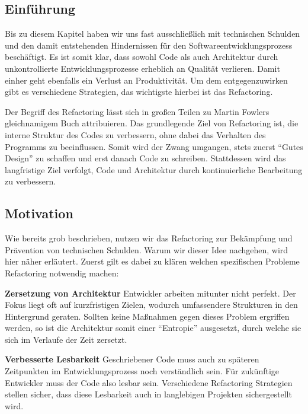 \documentclass[acmtog]{acmart}
\begin{document}
\subsection{Einführung}\label{sec:Refactoring_Einführung}

Bis zu diesem Kapitel haben wir uns fast ausschließlich mit technischen Schulden und den damit entstehenden Hindernissen für den Softwareentwicklungsprozess beschäftigt.
Es ist somit klar, dass sowohl Code als auch Architektur durch unkontrollierte Entwicklungsprozesse erheblich an Qualität verlieren.
Damit einher geht ebenfalls ein Verlust an Produktivität.
Um dem entgegenzuwirken gibt es verschiedene Strategien, das wichtigste hierbei ist das Refactoring.

Der Begriff des Refactoring lässt sich in großen Teilen zu Martin Fowlers gleichnamigem Buch attribuieren.
Das grundlegende Ziel von Refactoring ist, die interne Struktur des Codes zu verbessern, ohne dabei das Verhalten des Programms zu beeinflussen.
Somit wird der Zwang umgangen, stets zuerst “Gutes Design” zu schaffen und erst danach Code zu schreiben.
Stattdessen wird das langfristige Ziel verfolgt, Code und Architektur durch kontinuierliche Bearbeitung zu verbessern. \cite{fowler2019refactoring}

\subsection{Motivation}\label{sec:Motivation}

Wie bereits grob beschrieben, nutzen wir das Refactoring zur Bekämpfung und Prävention von technischen Schulden. Warum wir dieser Idee nachgehen, wird hier näher erläutert. Zuerst gilt es dabei zu klären welchen spezifischen Probleme Refactoring notwendig machen:

\textbf{Zersetzung von Architektur}
Entwickler arbeiten mitunter nicht perfekt. Der Fokus liegt oft auf kurzfristigen Zielen, wodurch umfassendere Strukturen in den Hintergrund geraten. Sollten keine Maßnahmen gegen dieses Problem ergriffen werden, so ist die Architektur somit einer “Entropie” ausgesetzt, durch welche sie sich im Verlaufe der Zeit zersetzt.

\textbf{Verbesserte Lesbarkeit}
Geschriebener Code muss auch zu späteren Zeitpunkten im Entwicklungsprozess noch verständlich sein. Für zukünftige Entwickler muss der Code also lesbar sein. Verschiedene Refactoring Strategien stellen sicher, dass diese Lesbarkeit auch in langlebigen Projekten sichergestellt wird.
\end{document}

